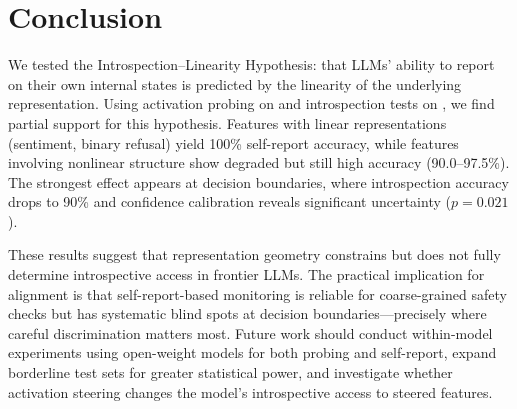 \section{Conclusion}
\label{sec:conclusion}

We tested the Introspection--Linearity Hypothesis: that LLMs' ability to report on their own internal states is predicted by the linearity of the underlying representation. Using activation probing on \qwen and introspection tests on \gptfour, we find partial support for this hypothesis. Features with linear representations (sentiment, binary refusal) yield 100\% self-report accuracy, while features involving nonlinear structure show degraded but still high accuracy (90.0--97.5\%). The strongest effect appears at decision boundaries, where introspection accuracy drops to 90\% and confidence calibration reveals significant uncertainty ($p = 0.021$).

These results suggest that representation geometry constrains but does not fully determine introspective access in frontier LLMs. The practical implication for alignment is that self-report-based monitoring is reliable for coarse-grained safety checks but has systematic blind spots at decision boundaries---precisely where careful discrimination matters most. Future work should conduct within-model experiments using open-weight models for both probing and self-report, expand borderline test sets for greater statistical power, and investigate whether activation steering changes the model's introspective access to steered features.
